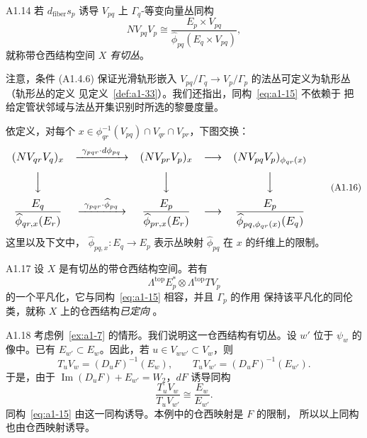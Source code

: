 \begin{definition}{A1.14}\label{def:a1-14}
若 $d_{\mathrm{fiber}}s_p$ 诱导 $V_{pq}$ 上 $\Gamma_q$-等变向量丛同构
\begin{equation}
 NV_{pq}V_p\cong
 \frac{E_p\times V_{pq}}
      {\widehat\phi_{pq}(E_q\times V_{pq})},
 \tag{A1.15}\label{eq:a1-15}
\end{equation}
就称带仓西结构空间 $X$ \emph{有切丛}。
\end{definition}

注意，条件 (A1.4.6) 保证光滑轨形嵌入
$V_{pq}/\Gamma_q\to V_p/\Gamma_p$ 的法丛可定义为轨形丛（轨形丛的定义
见定义~\ref{def:a1-33}）。我们还指出，同构~\eqref{eq:a1-15} 不依赖于
把给定管状邻域与法丛开集识别时所选的黎曼度量。

依定义，对每个
$x\in\phi_{qr}^{-1}(V_{pq})\cap V_{qr}\cap V_{pr}$，下图交换：
\begin{equation}
\resizebox{0.96\textwidth}{!}{$
\begin{array}{ccccc}
 (NV_{qr}V_q)_x
 &\xrightarrow{\ \gamma_{pqr}\cdot d\phi_{pq}\ }
 &(NV_{pr}V_p)_x
 &\longrightarrow
 &(NV_{pq}V_p)_{\phi_{qr}(x)}
 \\[0.7em]
 \Big\downarrow &&\Big\downarrow&&\Big\downarrow
 \\[0.7em]
 \displaystyle\frac{E_q}{\widehat\phi_{qr,x}(E_r)}
 &\xrightarrow{\ \gamma_{pqr}\cdot\widehat\phi_{pq}\ }
 &\displaystyle\frac{E_p}{\widehat\phi_{pr,x}(E_r)}
 &\longrightarrow
 &\displaystyle\frac{E_p}{\widehat\phi_{pq,\phi_{qr}(x)}(E_q)}
\end{array}$}
\tag{A1.16}\label{diag:a1-16}
\end{equation}
这里以及下文中，
$\widehat\phi_{pq,x}\colon E_q\to E_p$ 表示丛映射
$\widehat\phi_{pq}$ 在 $x$ 的纤维上的限制。

\begin{definition}{A1.17}\label{def:a1-17}
设 $X$ 是有切丛的带仓西结构空间。若有
\[
 \Lambda^{\mathrm{top}}E_p^*\otimes\Lambda^{\mathrm{top}}TV_p
\]
的一个平凡化，它与同构~\eqref{eq:a1-15} 相容，并且 $\Gamma_p$ 的作用
保持该平凡化的同伦类，就称 $X$ 上的仓西结构\emph{已定向}%
。
\end{definition}

\begin{example}{A1.18}\label{ex:a1-18}
考虑例~\ref{ex:a1-7} 的情形。我们说明这一仓西结构有切丛。设 $w'$ 位于
$\psi_w$ 的像中。已有 $E_{w'}\subset E_w$。因此，若
$u\in V_{ww'}\subset V_w$，则
\[
 T_uV_w=(D_uF)^{-1}(E_w),
 \qquad
 T_uV_{w'}=(D_uF)^{-1}(E_{w'}).
\]
于是，由于 $\operatorname{Im}(D_uF)+E_{w'}=W_2$，$dF$ 诱导同构
\[
 \frac{T_uV_w}{T_uV_{w'}}\cong\frac{E_w}{E_{w'}}.
\]
同构~\eqref{eq:a1-15} 由这一同构诱导。本例中的仓西映射是 $F$ 的限制，
所以以上同构也由仓西映射诱导。
\end{example}

